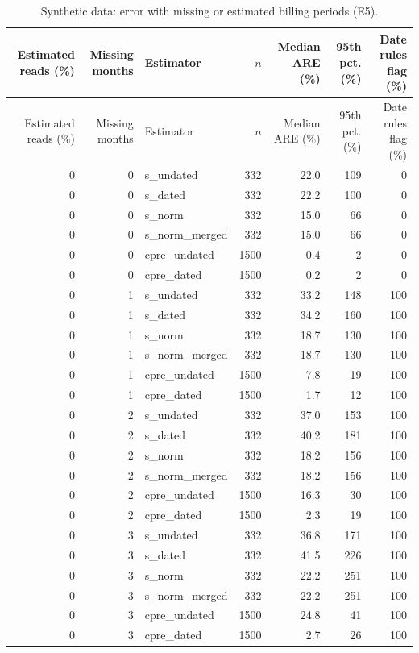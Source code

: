 \begin{longtable}{rrlrrrr}
\caption{Synthetic data: error with missing or estimated billing periods (E5).}\label{tab:e5}\\
\hline
Estimated reads (\%) & Missing months & Estimator & $n$ & Median ARE (\%) & 95th pct. (\%) & Date rules flag (\%) \\
\hline
\endfirsthead
\hline
Estimated reads (\%) & Missing months & Estimator & $n$ & Median ARE (\%) & 95th pct. (\%) & Date rules flag (\%) \\
\hline
\endhead
0 & 0 & s\_undated & 332 & 22.0 & 109 & 0 \\
0 & 0 & s\_dated & 332 & 22.2 & 100 & 0 \\
0 & 0 & s\_norm & 332 & 15.0 & 66 & 0 \\
0 & 0 & s\_norm\_merged & 332 & 15.0 & 66 & 0 \\
0 & 0 & cpre\_undated & 1500 & 0.4 & 2 & 0 \\
0 & 0 & cpre\_dated & 1500 & 0.2 & 2 & 0 \\
0 & 1 & s\_undated & 332 & 33.2 & 148 & 100 \\
0 & 1 & s\_dated & 332 & 34.2 & 160 & 100 \\
0 & 1 & s\_norm & 332 & 18.7 & 130 & 100 \\
0 & 1 & s\_norm\_merged & 332 & 18.7 & 130 & 100 \\
0 & 1 & cpre\_undated & 1500 & 7.8 & 19 & 100 \\
0 & 1 & cpre\_dated & 1500 & 1.7 & 12 & 100 \\
0 & 2 & s\_undated & 332 & 37.0 & 153 & 100 \\
0 & 2 & s\_dated & 332 & 40.2 & 181 & 100 \\
0 & 2 & s\_norm & 332 & 18.2 & 156 & 100 \\
0 & 2 & s\_norm\_merged & 332 & 18.2 & 156 & 100 \\
0 & 2 & cpre\_undated & 1500 & 16.3 & 30 & 100 \\
0 & 2 & cpre\_dated & 1500 & 2.3 & 19 & 100 \\
0 & 3 & s\_undated & 332 & 36.8 & 171 & 100 \\
0 & 3 & s\_dated & 332 & 41.5 & 226 & 100 \\
0 & 3 & s\_norm & 332 & 22.2 & 251 & 100 \\
0 & 3 & s\_norm\_merged & 332 & 22.2 & 251 & 100 \\
0 & 3 & cpre\_undated & 1500 & 24.8 & 41 & 100 \\
0 & 3 & cpre\_dated & 1500 & 2.7 & 26 & 100 \\

\end{longtable}
